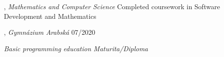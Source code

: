 
, \textit{Mathematics and Computer Science}	\hfill Completed coursework in Software Development and Mathematics

, \textit{Gymnázium Arabská} \hfill	07/2020

\textit{
Basic programming education
Maturita/Diploma\\}
